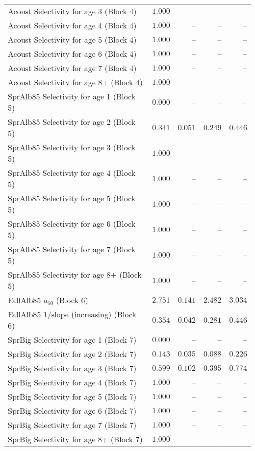 \documentclass[
]{article}
\begin{document}
\begin{landscape}
\begin{longtable}[t]{lrrrr}
Acoust Selectivity for age 3 (Block 4) & $1.000$ & -- & -- & --\\
Acoust Selectivity for age 4 (Block 4) & $1.000$ & -- & -- & --\\
Acoust Selectivity for age 5 (Block 4) & $1.000$ & -- & -- & --\\
Acoust Selectivity for age 6 (Block 4) & $1.000$ & -- & -- & --\\
\addlinespace
Acoust Selectivity for age 7 (Block 4) & $1.000$ & -- & -- & --\\
Acoust Selectivity for age 8+ (Block 4) & $1.000$ & -- & -- & --\\
SprAlb85 Selectivity for age 1 (Block 5) & $0.000$ & -- & -- & --\\
SprAlb85 Selectivity for age 2 (Block 5) & $0.341$ & $0.051$ & $0.249$ & $0.446$\\
SprAlb85 Selectivity for age 3 (Block 5) & $1.000$ & -- & -- & --\\
\addlinespace
SprAlb85 Selectivity for age 4 (Block 5) & $1.000$ & -- & -- & --\\
SprAlb85 Selectivity for age 5 (Block 5) & $1.000$ & -- & -- & --\\
SprAlb85 Selectivity for age 6 (Block 5) & $1.000$ & -- & -- & --\\
SprAlb85 Selectivity for age 7 (Block 5) & $1.000$ & -- & -- & --\\
SprAlb85 Selectivity for age 8+ (Block 5) & $1.000$ & -- & -- & --\\
\addlinespace
FallAlb85 $a_{50}$ (Block 6) & $2.751$ & $0.141$ & $2.482$ & $3.034$\\
FallAlb85 1/slope (increasing) (Block 6) & $0.354$ & $0.042$ & $0.281$ & $0.446$\\
SprBig Selectivity for age 1 (Block 7) & $0.000$ & -- & -- & --\\
SprBig Selectivity for age 2 (Block 7) & $0.143$ & $0.035$ & $0.088$ & $0.226$\\
SprBig Selectivity for age 3 (Block 7) & $0.599$ & $0.102$ & $0.395$ & $0.774$\\
\addlinespace
SprBig Selectivity for age 4 (Block 7) & $1.000$ & -- & -- & --\\
SprBig Selectivity for age 5 (Block 7) & $1.000$ & -- & -- & --\\
SprBig Selectivity for age 6 (Block 7) & $1.000$ & -- & -- & --\\
SprBig Selectivity for age 7 (Block 7) & $1.000$ & -- & -- & --\\
SprBig Selectivity for age 8+ (Block 7) & $1.000$ & -- & -- & --\\

\end{longtable}
\end{landscape}
\end{document}
